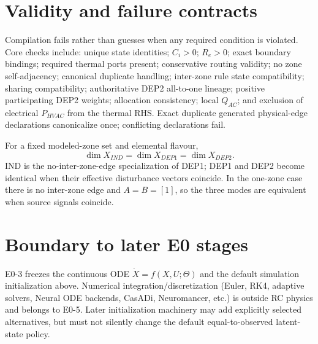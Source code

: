 \documentclass[11pt]{article}
\begin{document}
\section{Validity and failure contracts}
Compilation fails rather than guesses when any required condition is violated. Core checks include: unique state identities; $C_i>0$; $R_e>0$; exact boundary bindings; required thermal ports present; conservative routing validity; no zone self-adjacency; canonical duplicate handling; inter-zone rule state compatibility; sharing compatibility; authoritative DEP2 all-to-one lineage; positive participating DEP2 weights; allocation consistency; local $Q_{AC}$; and exclusion of electrical $P_{HVAC}$ from the thermal RHS. Exact duplicate generated physical-edge declarations canonicalize once; conflicting declarations fail.

For a fixed modeled-zone set and elemental flavour,
\[
\dim X_{IND}=\dim X_{DEP1}=\dim X_{DEP2}.
\]
IND is the no-inter-zone-edge specialization of DEP1; DEP1 and DEP2 become identical when their effective disturbance vectors coincide. In the one-zone case there is no inter-zone edge and $A=B=[1]$, so the three modes are equivalent when source signals coincide.

\section{Boundary to later E0 stages}
E0-3 freezes the continuous ODE $\dot X=f(X,U;\Theta)$ and the default simulation initialization above. Numerical integration/discretization (Euler, RK4, adaptive solvers, Neural ODE backends, CasADi, Neuromancer, etc.) is outside RC physics and belongs to E0-5. Later initialization machinery may add explicitly selected alternatives, but must not silently change the default equal-to-observed latent-state policy.



\end{document}
